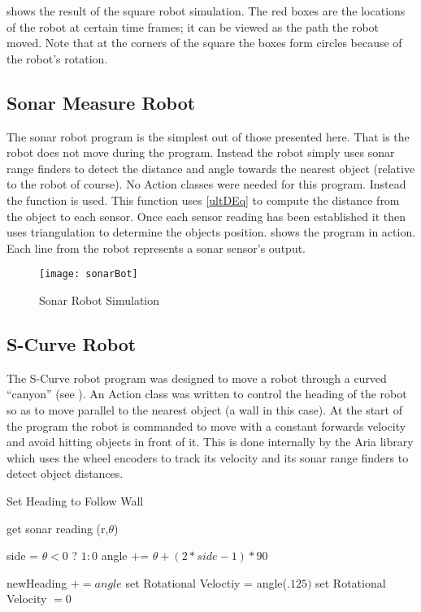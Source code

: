 \documentclass[main.tex]{subfiles}
\begin{document}
 shows the result of the square robot simulation. The red
boxes are the locations of the robot at certain time frames; it can be viewed as
the path the robot moved. Note that at the corners of the square the boxes form
circles because of the robot's rotation.

\subsection{Sonar Measure Robot} 

The sonar robot program is the simplest out of
those presented here. That is the robot does not move during the program.
Instead the robot simply uses sonar range finders to detect the distance and
angle towards the nearest object (relative to the robot of course). No Action
classes were needed for this program. Instead the  function
 is used.  This function uses
\eqref{ultDEq} to compute the distance from the object to each sensor. Once each
sensor reading has been established it then uses triangulation to determine the
objects position.  shows the program in action. Each line from
the robot represents a sonar sensor's output.

\begin{figure}[H]
\begin{center}
\texttt{[image: sonarBot]}
\end{center}
\caption{Sonar Robot Simulation}
\label{fig:sonarSim}
\end{figure}

\subsection{S-Curve Robot}

The S-Curve robot program was designed to move a robot through a curved
``canyon'' (see ). An Action class was written to control the
heading of the robot so as to move parallel to the nearest object (a wall in
this case). At the start of the program the robot is commanded to move with a
constant forwards velocity and avoid hitting objects in front of it. This is
done internally by the Aria library which uses the wheel encoders to track its
velocity and its sonar range finders to detect object distances.

\begin{algorithm}
\caption{Set Heading to Follow Wall}
\label{al:folWall}
\begin{algorithmic}
\STATE get sonar reading (r,$\theta$)

\STATE side = $\theta < 0$ ? $1 : 0$
\STATE angle += $\theta + (2*side-1)*90$

	\STATE newHeading $+= angle$
	\STATE set Rotational Veloctiy = angle($.125)$
\ELSE 
	\STATE set Rotational Velocity $= 0$
\ENDIF

\end{algorithmic}
\end{algorithm}
\end{document}
